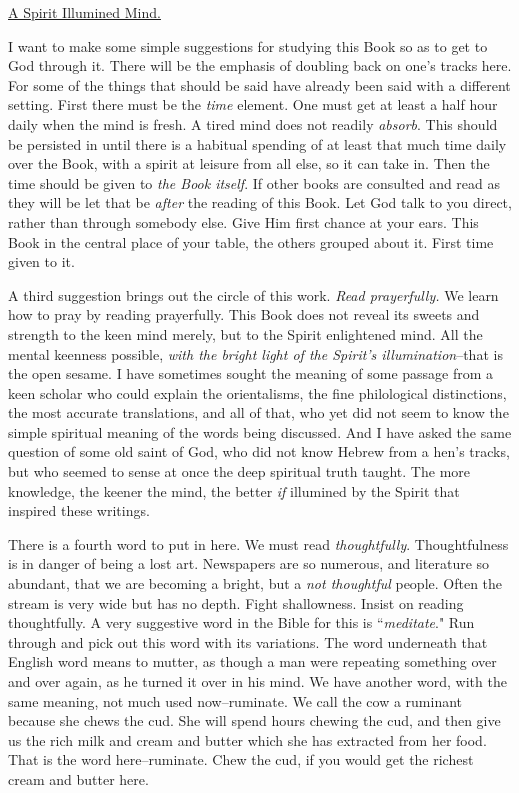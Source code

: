 \underline{A Spirit Illumined Mind.}


I want to make some simple suggestions for studying this Book so as to get
to God through it. There will be the emphasis of doubling back on one's
tracks here. For some of the things that should be said have already been
said with a different setting. First there must be the \textit{time} element.
One must get at least a half hour daily when the mind is fresh. A tired
mind does not readily \textit{absorb}. This should be persisted in until there is
a habitual spending of at least that much time daily over the Book, with a
spirit at leisure from all else, so it can take in. Then the time should
be given to \textit{the Book itself}. If other books are consulted and read as
they will be let that be \textit{after} the reading of this Book. Let God talk to
you direct, rather than through somebody else. Give Him first chance at
your ears. This Book in the central place of your table, the others
grouped about it. First time given to it.

A third suggestion brings out the circle of this work. \textit{Read prayerfully.}
We learn how to pray by reading prayerfully. This Book does not reveal its
sweets and strength to the keen mind merely, but to the Spirit enlightened
mind. All the mental keenness possible, \textit{with the bright light of the
Spirit's illumination}--that is the open sesame. I have sometimes sought
the meaning of some passage from a keen scholar who could explain the
orientalisms, the fine philological distinctions, the most accurate
translations, and all of that, who yet did not seem to know the simple
spiritual meaning of the words being discussed. And I have asked the same
question of some old saint of God, who did not know Hebrew from a hen's
tracks, but who seemed to sense at once the deep spiritual truth taught.
The more knowledge, the keener the mind, the better \textit{if} illumined by the
Spirit that inspired these writings.

There is a fourth word to put in here. We must read \textit{thoughtfully}.
Thoughtfulness is in danger of being a lost art. Newspapers are so
numerous, and literature so abundant, that we are becoming a bright, but a
\textit{not thoughtful} people. Often the stream is very wide but has no depth.
Fight shallowness. Insist on reading thoughtfully. A very suggestive word
in the Bible for this is ``\textit{meditate}." Run through and pick out this word
with its variations. The word underneath that English word means to
mutter, as though a man were repeating something over and over again, as
he turned it over in his mind. We have another word, with the same
meaning, not much used now--ruminate. We call the cow a ruminant because
she chews the cud. She will spend hours chewing the cud, and then give us
the rich milk and cream and butter which she has extracted from her food.
That is the word here--ruminate. Chew the cud, if you would get the
richest cream and butter here.

